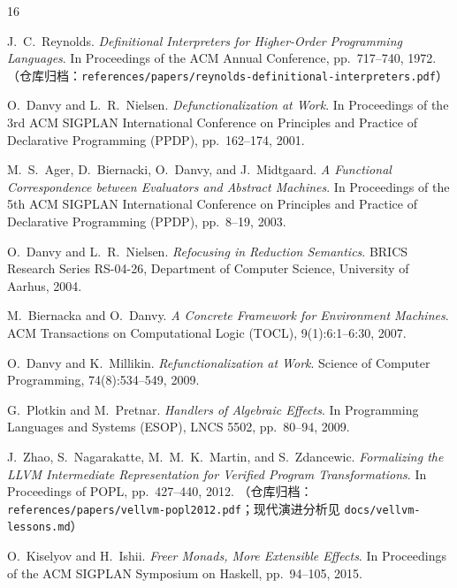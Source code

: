 \documentclass[UTF8,a4paper,11pt,fontset=fandol]{ctexart}
\newcommand{\code}[1]{\texttt{#1}}
\begin{document}
{\small
\begin{thebibliography}{16}
\setlength{\itemsep}{2pt}
\setlength{\parskip}{0pt}

J.~C.~Reynolds.
\emph{Definitional Interpreters for Higher-Order Programming Languages}.
In Proceedings of the ACM Annual Conference, pp.~717--740, 1972.
（仓库归档：\code{references/papers/reynolds-definitional-interpreters.pdf}）

O.~Danvy and L.~R.~Nielsen.
\emph{Defunctionalization at Work}.
In Proceedings of the 3rd ACM SIGPLAN International Conference on Principles and Practice of Declarative Programming (PPDP), pp.~162--174, 2001.

M.~S.~Ager, D.~Biernacki, O.~Danvy, and J.~Midtgaard.
\emph{A Functional Correspondence between Evaluators and Abstract Machines}.
In Proceedings of the 5th ACM SIGPLAN International Conference on Principles and Practice of Declarative Programming (PPDP), pp.~8--19, 2003.

O.~Danvy and L.~R.~Nielsen.
\emph{Refocusing in Reduction Semantics}.
BRICS Research Series RS-04-26, Department of Computer Science, University of Aarhus, 2004.

M.~Biernacka and O.~Danvy.
\emph{A Concrete Framework for Environment Machines}.
ACM Transactions on Computational Logic (TOCL), 9(1):6:1--6:30, 2007.

O.~Danvy and K.~Millikin.
\emph{Refunctionalization at Work}.
Science of Computer Programming, 74(8):534--549, 2009.

G.~Plotkin and M.~Pretnar.
\emph{Handlers of Algebraic Effects}.
In Programming Languages and Systems (ESOP), LNCS 5502, pp.~80--94, 2009.

J.~Zhao, S.~Nagarakatte, M.~M.~K.~Martin, and S.~Zdancewic.
\emph{Formalizing the LLVM Intermediate Representation for Verified Program Transformations}.
In Proceedings of POPL, pp.~427--440, 2012.
（仓库归档：\code{references/papers/vellvm-popl2012.pdf}；现代演进分析见 \code{docs/vellvm-lessons.md}）

O.~Kiselyov and H.~Ishii.
\emph{Freer Monads, More Extensible Effects}.
In Proceedings of the ACM SIGPLAN Symposium on Haskell, pp.~94--105, 2015.


\end{thebibliography}}
\end{document}
